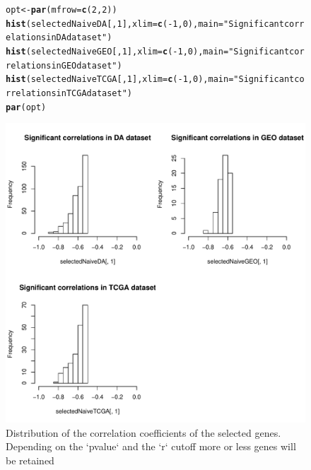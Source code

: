 \documentclass[a4paper,10pt]{article}\usepackage[]{graphicx}\usepackage[]{color}
\makeatletter
\def\maxwidth{ %
  \ifdim\Gin@nat@width>\linewidth
    \linewidth
  \else
    \Gin@nat@width
  \fi
}
\newcommand{\hlnum}[1]{\textcolor[rgb]{0.686,0.059,0.569}{#1}}%
\newcommand{\hlstr}[1]{\textcolor[rgb]{0.192,0.494,0.8}{#1}}%
\newcommand{\hlopt}[1]{\textcolor[rgb]{0,0,0}{#1}}%
\newcommand{\hlstd}[1]{\textcolor[rgb]{0.345,0.345,0.345}{#1}}%
\newcommand{\hlkwb}[1]{\textcolor[rgb]{0.69,0.353,0.396}{#1}}%
\newcommand{\hlkwc}[1]{\textcolor[rgb]{0.333,0.667,0.333}{#1}}%
\newcommand{\hlkwd}[1]{\textcolor[rgb]{0.737,0.353,0.396}{\textbf{#1}}}%
\newenvironment{kframe}{%
 \def\at@end@of@kframe{}%
 \ifinner\ifhmode%
  \def\at@end@of@kframe{\end{minipage}}%
  \begin{minipage}{\columnwidth}%
 \fi\fi%
 \def\FrameCommand##1{\hskip\@totalleftmargin \hskip-\fboxsep
 \colorbox{shadecolor}{##1}\hskip-\fboxsep
     \hskip-\linewidth \hskip-\@totalleftmargin \hskip\columnwidth}%
 \MakeFramed {\advance\hsize-\width
   \@totalleftmargin\z@ \linewidth\hsize
   \@setminipage}}%
 {\par\unskip\endMakeFramed%
 \at@end@of@kframe}
\newenvironment{knitrout}{}{} %
\makeatother
\begin{document}
\begin{figure}[htbp]
\begin{knitrout}
\color{fgcolor}\begin{kframe}
\begin{alltt}
\hlstd{opt}\hlkwb{<-}\hlkwd{par}\hlstd{(}\hlkwc{mfrow}\hlstd{=}\hlkwd{c}\hlstd{(}\hlnum{2}\hlstd{,}\hlnum{2}\hlstd{))}
\hlkwd{hist}\hlstd{(selectedNaiveDA[,}\hlnum{1}\hlstd{],} \hlkwc{xlim}\hlstd{=}\hlkwd{c}\hlstd{(}\hlopt{-}\hlnum{1}\hlstd{,}\hlnum{0}\hlstd{),} \hlkwc{main}\hlstd{=}\hlstr{"Significant correlations in DA dataset"}\hlstd{)}
\hlkwd{hist}\hlstd{(selectedNaiveGEO[,}\hlnum{1}\hlstd{],} \hlkwc{xlim}\hlstd{=}\hlkwd{c}\hlstd{(}\hlopt{-}\hlnum{1}\hlstd{,}\hlnum{0}\hlstd{),} \hlkwc{main}\hlstd{=}\hlstr{"Significant correlations in GEO dataset"}\hlstd{)}
\hlkwd{hist}\hlstd{(selectedNaiveTCGA[,}\hlnum{1}\hlstd{],} \hlkwc{xlim}\hlstd{=}\hlkwd{c}\hlstd{(}\hlopt{-}\hlnum{1}\hlstd{,}\hlnum{0}\hlstd{),} \hlkwc{main}\hlstd{=}\hlstr{"Significant correlations in TCGA dataset"}\hlstd{)}
\hlkwd{par}\hlstd{(opt)}
\end{alltt}
\end{kframe}
\includegraphics[width=\maxwidth]{figure/showCorrs-1} 

\end{knitrout}
\caption{Distribution of the correlation coefficients of the selected genes. Depending on the `pvalue` and the `r` cutoff more or less genes will be retained\label{showCorrs1}}
\end{figure}
\end{document}

